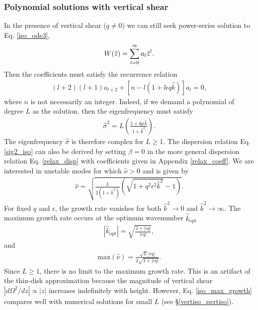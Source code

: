 \subsubsection{Polynomial solutions with vertical
  shear}\label{iso_poly}
In the presence of vertical shear ($q\neq0$) we can still seek power-series solution to
Eq. \ref{iso_ode3}, 
\begin{align}
  W(\hat{z}) = \sum_{l=0}^\infty a_l\hat{z}^l. 
\end{align}
Then the coefficients must satisfy the recurrence relation
\begin{align}
  (l+2)(l+1)a_{l+2} +
  \left[n - l\left(1+\ii \epsilon q  \hat{k}\right)\right] a_l = 0, 
\end{align}
where $n$ is not necessarily an integer. Indeed, if we demand
a polynomial of degree $L$ as the solution, then the eigenfrequency
must satisfy
\begin{align}\label{sig2_iso}
  \hat{\sigma}^2 = L\left(\frac{1+\ii q \epsilon
      \hat{k}}{1+\hat{k}^2}\right).
\end{align}
The eigenfrequency $\hat{\sigma}$ is therefore complex for
$L\geq1$. The dispersion relation Eq. \ref{sig2_iso} can also be
derived by setting $\beta=0$ in the more general dispersion relation 
Eq. \ref{relax_disp} with coefficients given in Appendix
\ref{relax_coeff}. We are interested in 
unstable modes for which $\hat{\nu}>0$ and is given by
\begin{align}\label{simple_growth}
  \hat{\nu} =\sqrt{
    \frac{L}{2\left(1+\hat{k}^2\right)}\left(\sqrt{1+q^2\epsilon^2\hat{k}^2} - 
      1\right)}. 
\end{align}
For fixed $q$ and $\epsilon$, the growth rate vanishes for both
$\hat{k}^2\to0$ and $\hat{k}^2\to\infty$. 
The maximum growth rate
occurs at the optimum wavenumber $\hat{k}_\mathrm{opt}$
\begin{align}
  |\hat{k}_\mathrm{opt}| = \sqrt{\frac{2+|\epsilon q|}{|\epsilon q|}},
\end{align}
and
\begin{align}
  \mathrm{max}\left(\hat{\nu}\right) =\frac{\sqrt{L}|\epsilon
    q|}{2\sqrt{1+|\epsilon q|}}. \label{iso_max_growth}
\end{align}
Since $L\geq1$, there is no limit to the maximum growth rate. This is
an artifact of the thin-disk approximation because the magnitude of vertical 
shear $|d\Omega^2/dz|\propto |z|$ increases indefinitely with 
height. However, Eq. \ref{iso_max_growth} compares well with
numerical solutions for small $L$ (see \S\ref{vertiso_pertiso}). 





























